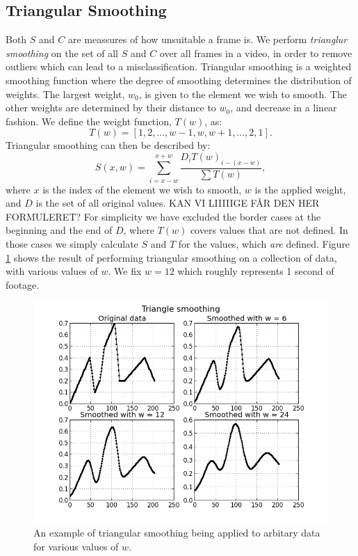 \subsection{Triangular Smoothing}\label{sec:triangularsmoothing}
%
Both $S$ and $C$ are meassures of how unsuitable a frame is. We perform \textit{trianglur smoothing} on the set of all $S$ and $C$ over all frames in a video, in order to remove outliers which can lead to a misclassification. Triangular smoothing is a weighted smoothing function where the degree of smoothing determines the distribution of weights. The largest weight, $w_0$, is given to the element we wish to smooth. %
The other weights are determined by their distance to $w_0$, and decrease in a linear fashion. We define the weight function, $T(w)$, as:
%
\begin{equation}
T(w) = [1,2,\dots,w-1,w,w+1,\dots,2,1].
\end{equation}\label{eq:triangular}
%
Triangular smoothing can then be described by:
%
\[
S(x, w) = \sum_{i=x-w}^{x+w} \frac{D_{i} T(w)_{i-(x-w)}}{\sum T(w)},
\]
%
where $x$ is the index of the element we wish to smooth, $w$ is the applied weight, and $D$ is the set of all original values. %
KAN VI LIIIIIGE FÅR DEN HER FORMULERET?
For simplicity we have excluded the border cases at the beginning and the end of $D$, where $T(w)$ covers values that are not defined. In those cases we simply calculate $S$ and $T$ for the values, which \textit{are} defined. Figure \ref{fig:triangularsmoothing} shows the result of performing triangular smoothing on a collection of data, with various values of $w$. We fix $w = 12$ which roughly represents 1 second of footage.
%
\begin{figure}
     \centering
     \includegraphics[width=1\textwidth]{img/triangle_smooth.png}
     \caption{An example of triangular smoothing being applied to arbitary data for various values of $w$.}
     \label{fig:triangularsmoothing}
\end{figure}
%
